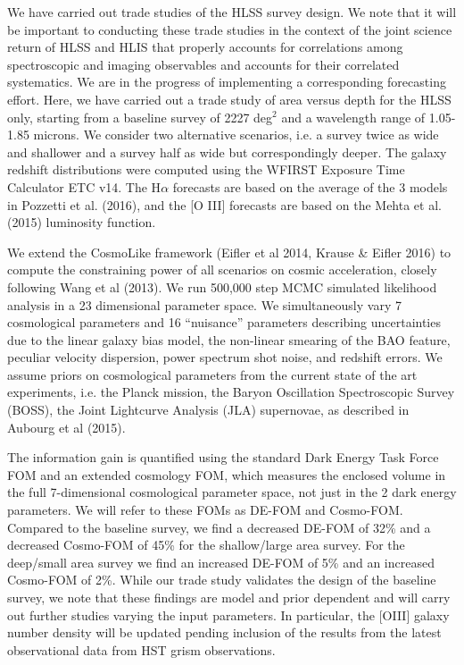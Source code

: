  We have carried out trade studies of the HLSS survey design. We note that it
 will be important to conducting these trade studies in the context of the joint
 science return of HLSS and HLIS that properly accounts for correlations among
 spectroscopic and imaging observables and accounts for their correlated
 systematics.  We are in the progress of implementing a corresponding forecasting
 effort.  Here, we have carried out a trade study of area versus depth for the
 HLSS only, starting from a baseline survey of 2227 deg$^2$ and a wavelength
 range of 1.05-1.85 microns. We consider two alternative scenarios, i.e. a survey
 twice as wide and shallower and a survey half as wide but correspondingly
 deeper.  The galaxy redshift distributions were computed using the WFIRST
 Exposure Time Calculator ETC v14. The H$\alpha$ forecasts are based on the average
 of the 3 models in Pozzetti et al. (2016), and the [O III] forecasts are based
 on the Mehta et al.  (2015) luminosity function.

 We extend the CosmoLike framework (Eifler et  al 2014, Krause \& Eifler 2016) to compute the constraining power of all scenarios
 on cosmic acceleration, closely following Wang et al (2013). We run 500,000 step
 MCMC simulated likelihood analysis in a 23 dimensional parameter space. We
 simultaneously vary 7 cosmological parameters and 16 ``nuisance'' parameters
 describing uncertainties due to the linear galaxy bias model, the non-linear
 smearing of the BAO feature, peculiar velocity dispersion, power spectrum shot
 noise, and redshift errors. We assume priors on cosmological parameters from the
 current state of the art experiments, i.e. the Planck mission, the Baryon
 Oscillation Spectroscopic Survey (BOSS), the Joint Lightcurve Analysis (JLA)
 supernovae, as described in Aubourg et al (2015).

 The information gain is quantified using the standard Dark Energy Task Force FOM
 and an extended cosmology FOM, which measures the enclosed volume in the full
 7-dimensional cosmological parameter space, not just in the 2 dark energy
 parameters. We will refer to these FOMs as DE-FOM and Cosmo-FOM.  Compared to
 the baseline survey, we find a decreased DE-FOM of 32\% and a decreased
 Cosmo-FOM of 45\% for the shallow/large area survey. For the deep/small area
 survey we find an increased DE-FOM of 5\% and an increased Cosmo-FOM of 2\%.
 While our trade study validates the design of the baseline survey, we note that
 these findings are model and prior dependent and will carry out further studies
 varying the input parameters. In particular, the [OIII] galaxy number density
 will be updated pending inclusion of the results from the latest observational
 data from HST grism observations.

